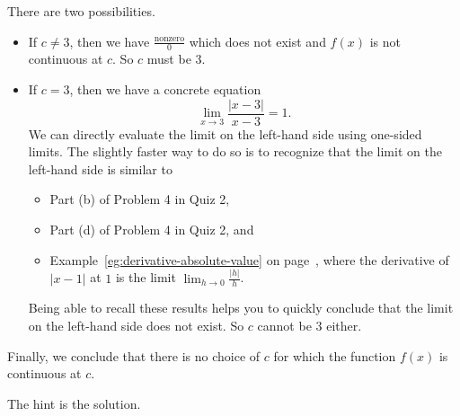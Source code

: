 \documentclass[../main.tex]{subfiles}
\begin{document}
\begin{exercise}
\begin{hint}
\begin{itemize}
        There are two possibilities.
        \begin{itemize}
          \item If \(c \ne 3\), then we have \(\frac{\text{nonzero}}{0}\) which does not exist and \(f(x)\) is not continuous at \(c\). So \(c\) must be \(3\).
          \item If \(c = 3\), then we have a concrete equation
            \[
              \lim_{x \to 3} \frac{|x-3|}{x-3} = 1.
            \]
            We can directly evaluate the limit on the left-hand side using one-sided limits. The slightly faster way to do so is to recognize that the limit on the left-hand side is similar to
            \begin{itemize}
              \item Part (b) of Problem 4 in Quiz 2,
              \item Part (d) of Problem 4 in Quiz 2, and
              \item Example~\ref{eg:derivative-absolute-value} on page~\pageref{eg:derivative-absolute-value}, where the derivative of \(|x-1|\) at \(1\) is the limit \(\lim_{h \to 0} \frac{|h|}{h}\).
            \end{itemize}

            Being able to recall these results helps you to quickly conclude that the limit on the left-hand side does not exist.  So \(c\) cannot be \(3\) either.
        \end{itemize}
    \end{itemize}

    Finally, we conclude that there is no choice of \(c\) for which the function \(f(x)\) is continuous at \(c\).
  \end{hint}
  \begin{solution}
    The hint is the solution.
  \end{solution}
\end{exercise}
\nopagebreak\vfill
\end{document}
